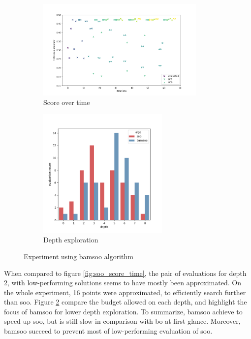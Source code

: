 \begin{figure}[h]
    \centering
    \begin{subfigure}[b]{.5\textwidth}
      \centering
      \includegraphics[width = 0.9\textwidth]{assets/img/chap_4/experiments/plots/bamsoo/score_evolution.png} 
      \caption{Score over time}
      \label{fig:bamsoo_score_time}
    \end{subfigure}%
    \begin{subfigure}[b]{.4\textwidth}
      \centering
      \includegraphics[width = 0.7\textwidth]{assets/img/chap_4/experiments/plots/bamsoo/depth_compar.png} 
      \caption{Depth exploration }
      \label{fig:bamsoo_soo_depth}
    \end{subfigure}
    \caption{Experiment using \acrshort{bamsoo} algorithm}
    \label{fig:bamsoo_res}
\end{figure}

When compared to figure \ref{fig:soo_score_time}, the pair of evaluations for depth 2, with low-performing solutions seems to have mostly been approximated. On the whole experiment, 16 points were approximated, to efficiently search further than \acrshort{soo}. Figure \ref{fig:bamsoo_soo_depth} compare the budget allowed on each depth, and highlight the focus of \acrshort{bamsoo} for lower depth exploration.
To summarize, \acrshort{bamsoo} achieve to speed up \acrshort{soo}, but is still slow in comparison with \acrshort{bo} at first glance. Moreover, \acrshort{bamsoo} succeed to prevent most of low-performing evaluation of \acrshort{soo}.


